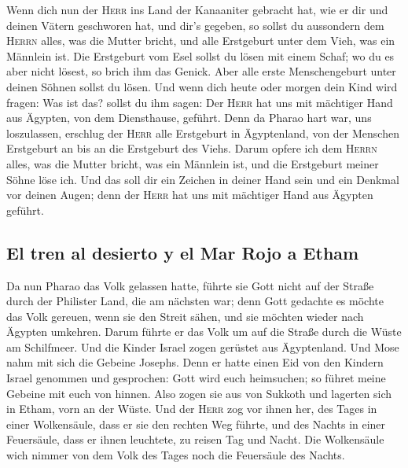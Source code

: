  Wenn dich nun der \textsc{Herr} ins Land der Kanaaniter
gebracht hat, wie er dir und deinen Vätern geschworen hat, und dir's
gegeben,  so sollst du aussondern dem \textsc{Herrn}
alles, was die Mutter bricht, und alle Erstgeburt unter dem Vieh, was
ein Männlein ist.  Die Erstgeburt vom Esel sollst du
lösen mit einem Schaf; wo du es aber nicht lösest, so brich ihm das
Genick. Aber alle erste Menschengeburt unter deinen Söhnen sollst du
lösen.  Und wenn dich heute oder morgen dein Kind wird
fragen: Was ist das? sollst du ihm sagen: Der \textsc{Herr} hat uns mit
mächtiger Hand aus Ägypten, von dem Diensthause, geführt.
 Denn da Pharao hart war, uns loszulassen, erschlug der
\textsc{Herr} alle Erstgeburt in Ägyptenland, von der Menschen
Erstgeburt an bis an die Erstgeburt des Viehs. Darum opfere ich dem
\textsc{Herrn} alles, was die Mutter bricht, was ein Männlein ist, und
die Erstgeburt meiner Söhne löse ich.  Und das soll dir
ein Zeichen in deiner Hand sein und ein Denkmal vor deinen Augen; denn
der \textsc{Herr} hat uns mit mächtiger Hand aus Ägypten geführt.

\hypertarget{el-tren-al-desierto-y-el-mar-rojo-a-etham}{%
\subsection{El tren al desierto y el Mar Rojo a
Etham}\label{el-tren-al-desierto-y-el-mar-rojo-a-etham}}

 Da nun Pharao das Volk gelassen hatte, führte sie Gott
nicht auf der Straße durch der Philister Land, die am nächsten war; denn
Gott gedachte es möchte das Volk gereuen, wenn sie den Streit sähen, und
sie möchten wieder nach Ägypten umkehren.  Darum führte
er das Volk um auf die Straße durch die Wüste am Schilfmeer. Und die
Kinder Israel zogen gerüstet aus Ägyptenland.  Und Mose
nahm mit sich die Gebeine Josephs. Denn er hatte einen Eid von den
Kindern Israel genommen und gesprochen: Gott wird euch heimsuchen; so
führet meine Gebeine mit euch von hinnen.  Also zogen sie
aus von Sukkoth und lagerten sich in Etham, vorn an der Wüste.
 Und der \textsc{Herr} zog vor ihnen her, des Tages in
einer Wolkensäule, dass er sie den rechten Weg führte, und des Nachts in
einer Feuersäule, dass er ihnen leuchtete, zu reisen Tag und Nacht.
 Die Wolkensäule wich nimmer von dem Volk des Tages noch
die Feuersäule des Nachts.

